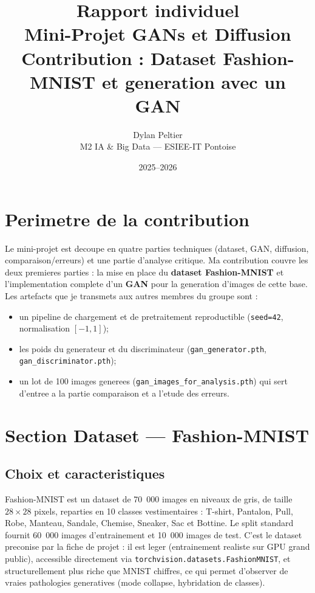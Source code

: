 \documentclass[11pt,a4paper]{article}
\title{\textbf{Rapport individuel} \\
       \large Mini-Projet GANs et Diffusion \\
       Contribution : Dataset Fashion-MNIST et generation avec un GAN}
\author{Dylan Peltier \\ M2 IA \& Big Data --- ESIEE-IT Pontoise}
\date{2025--2026}
\begin{document}
\maketitle

\section{Perimetre de la contribution}

Le mini-projet est decoupe en quatre parties techniques (dataset, GAN, diffusion, comparaison/erreurs) et une partie d'analyse critique. Ma contribution couvre les deux premieres parties : la mise en place du \textbf{dataset Fashion-MNIST} et l'implementation complete d'un \textbf{GAN} pour la generation d'images de cette base. Les artefacts que je transmets aux autres membres du groupe sont :

\begin{itemize}
    \item un pipeline de chargement et de pretraitement reproductible (\texttt{seed=42}, normalisation $[-1, 1]$);
    \item les poids du generateur et du discriminateur (\texttt{gan\_generator.pth}, \texttt{gan\_discriminator.pth});
    \item un lot de 100 images generees (\texttt{gan\_images\_for\_analysis.pth}) qui sert d'entree a la partie comparaison et a l'etude des erreurs.
\end{itemize}

\section{Section Dataset --- Fashion-MNIST}

\subsection{Choix et caracteristiques}

Fashion-MNIST est un dataset de 70~000 images en niveaux de gris, de taille $28 \times 28$ pixels, reparties en 10 classes vestimentaires : T-shirt, Pantalon, Pull, Robe, Manteau, Sandale, Chemise, Sneaker, Sac et Bottine. Le split standard fournit 60~000 images d'entrainement et 10~000 images de test. C'est le dataset preconise par la fiche de projet : il est leger (entrainement realiste sur GPU grand public), accessible directement via \texttt{torchvision.datasets.FashionMNIST}, et structurellement plus riche que MNIST chiffres, ce qui permet d'observer de vraies pathologies generatives (mode collapse, hybridation de classes).
\end{document}
